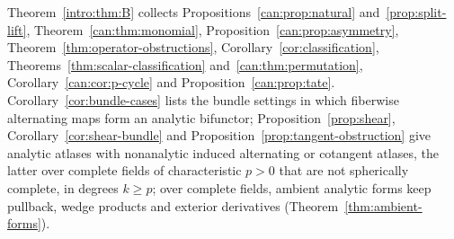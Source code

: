 Theorem~\ref{intro:thm:B} collects Propositions~\ref{can:prop:natural} and~\ref{prop:split-lift},
Theorem~\ref{can:thm:monomial}, Proposition~\ref{can:prop:asymmetry}, Theorem~\ref{thm:operator-obstructions},
Corollary~\ref{cor:classification}, Theorems~\ref{thm:scalar-classification} and~\ref{can:thm:permutation},
Corollary~\ref{can:cor:p-cycle} and Proposition~\ref{can:prop:tate}. Corollary~\ref{cor:bundle-cases} lists the bundle
settings in which fiberwise alternating maps form an analytic bifunctor; Proposition~\ref{prop:shear},
Corollary~\ref{cor:shear-bundle} and Proposition~\ref{prop:tangent-obstruction} give analytic atlases with nonanalytic
induced alternating or cotangent atlases, the latter over complete fields of characteristic $p>0$ that are not
spherically complete, in degrees $k\ge p$; over complete fields, ambient analytic forms keep pullback, wedge products
and exterior derivatives (Theorem~\ref{thm:ambient-forms}).


